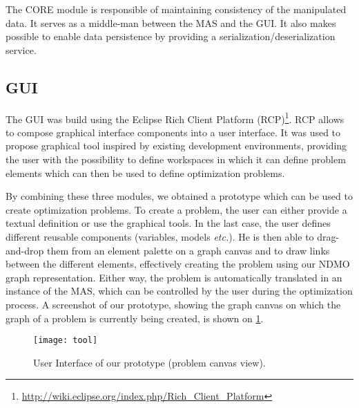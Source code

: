 The CORE module is responsible of maintaining consistency of the manipulated data. It serves as a middle-man between the MAS and the GUI. It also makes possible to enable data persistence by providing a serialization/deserialization service.

\subsection{GUI}

The GUI was build using the Eclipse Rich Client Platform (RCP)\footnote{\url{http://wiki.eclipse.org/index.php/Rich_Client_Platform}}. RCP allows to compose graphical interface components into a user interface. It was used to propose graphical tool inspired by existing development environments, providing the user with the possibility to define workspaces in which it can define problem elements which can then be used to define optimization problems.

\bigskip

By combining these three modules, we obtained a prototype which can be used to create optimization problems. To create a problem, the user can either provide a textual definition or use the graphical tools. In the last case, the user defines different reusable components (variables, models \emph{etc.}). He is then able to drag-and-drop them from an element palette on a graph canvas and to draw links between the different elements, effectively creating the problem using our NDMO graph representation. Either way, the problem is automatically translated in an instance of the MAS, which can be controlled by the user during the optimization process. A screenshot of our prototype, showing the graph canvas on which the graph of a problem is currently being created, is shown on \figurename{} \ref{tool}.

\begin{figure}
\texttt{[image: tool]}
\caption{User Interface of our prototype (problem canvas view).}\label{tool}
\end{figure}